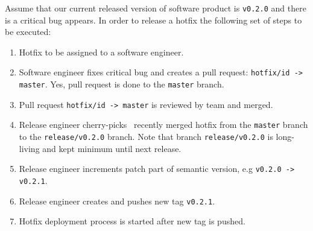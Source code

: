 ﻿Assume that our current released version of software product is \texttt{v0.2.0} and there is a critical bug appears.
In order to release a hotfix the following set of steps to be executed:
\begin{enumerate}
    \item Hotfix to be assigned to a software engineer.
    \item Software engineer fixes critical bug and creates a pull request: \texttt{hotfix/id -> master}.
    Yes, pull request is done to the \texttt{master} branch.
    \item Pull request \texttt{hotfix/id -> master} is reviewed by team and merged.
    \item Release engineer cherry-picks~\cite{CherryPick} recently merged hotfix from the \texttt{master} branch
    to the \texttt{release/v0.2.0} branch.
    Note that branch \texttt{release/v0.2.0} is long-living and kept minimum until next release.
    \item Release engineer increments patch part of semantic version, e.g \texttt{v0.2.0 -> v0.2.1}.
    \item Release engineer creates and pushes new tag \texttt{v0.2.1}.
    \item Hotfix deployment process is started after new tag is pushed.
\end{enumerate}
